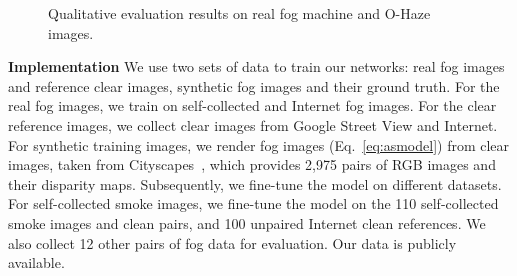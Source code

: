 \documentclass[runningheads]{llncs}
\begin{document}
\begin{figure*}[t!]
	\hfill
	\hfill
	\hfill
	\hfill
	\hfill
	\hfill
	\hfill
	\caption{Qualitative evaluation results on real fog machine and O-Haze~\cite{ancuti2018haze} images.}
	\label{fig:ohaze}
\end{figure*}

\noindent \textbf{Implementation}
We use two sets of data to train our networks: real fog images and reference clear images, synthetic fog images and their ground truth.
For the real fog images, we train on self-collected and Internet fog images.
For the clear reference images, we collect clear images from Google Street View and Internet.
For synthetic training images, we render fog images (Eq.~\ref{eq:asmodel}) from clear images, taken from Cityscapes~\cite{cordts2016cityscapes}, which provides 2,975 pairs of RGB images and their disparity maps.
Subsequently, we fine-tune the model on different datasets. 
For self-collected smoke images, we fine-tune the model on the 110 self-collected smoke images and clean pairs, and 100 unpaired Internet clean references.
We also collect 12 other pairs of fog data for evaluation. Our data is publicly available.
\end{document}
